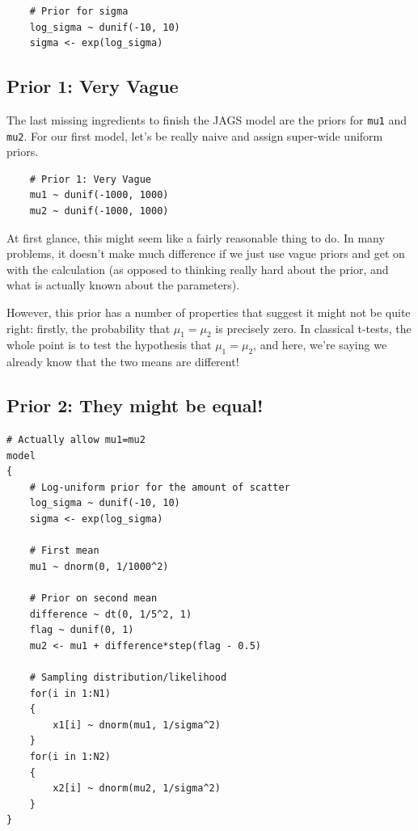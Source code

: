 \begin{framed}
\begin{verbatim}
    # Prior for sigma
    log_sigma ~ dunif(-10, 10)
    sigma <- exp(log_sigma)
\end{verbatim}
\end{framed}

\subsection{Prior 1: Very Vague}
The last missing ingredients to finish the JAGS model are the priors for
{\tt mu1} and {\tt mu2}. For our first model, let's be really naive and assign
super-wide uniform priors.

\begin{framed}
\begin{verbatim}
    # Prior 1: Very Vague
    mu1 ~ dunif(-1000, 1000)
    mu2 ~ dunif(-1000, 1000)
\end{verbatim}
\end{framed}

At first glance, this might seem like a fairly reasonable thing to do. In many
problems, it doesn't make much difference if we just use vague priors and get
on with the calculation (as opposed to thinking really hard about the prior,
and what is actually known about the parameters).

However, this prior has a number of properties that suggest it might not be
quite right: firstly, the probability that $\mu_1 = \mu_2$ is precisely zero.
In classical t-tests, the whole point is to test the hypothesis that
$\mu_1 = \mu_2$, and here, we're saying we already know that the two means
are different!


\subsection{Prior 2: They might be equal!}

\begin{framed}
\begin{verbatim}
# Actually allow mu1=mu2
model
{
    # Log-uniform prior for the amount of scatter
    log_sigma ~ dunif(-10, 10)
    sigma <- exp(log_sigma)

    # First mean
    mu1 ~ dnorm(0, 1/1000^2)

    # Prior on second mean
    difference ~ dt(0, 1/5^2, 1)
    flag ~ dunif(0, 1)
    mu2 <- mu1 + difference*step(flag - 0.5)

    # Sampling distribution/likelihood
    for(i in 1:N1)
    {
        x1[i] ~ dnorm(mu1, 1/sigma^2)
    }
    for(i in 1:N2)
    {
        x2[i] ~ dnorm(mu2, 1/sigma^2)
    }
}
\end{verbatim}
\end{framed}

